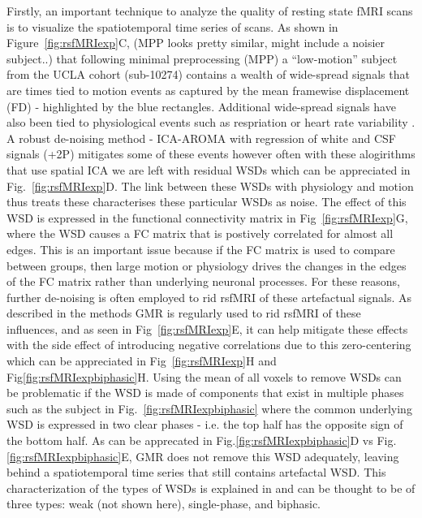 \documentclass[oneside]{zHenriquesLab-StyleBioRxiv}
\begin{document}
Firstly, an important technique to analyze the quality of resting state fMRI scans is to visualize the spatiotemporal time series of scans. As shown in Figure~\ref{fig:rsfMRIexp}C, (MPP looks pretty similar, might include a noisier subject..) that following minimal preprocessing (MPP) a ``low-motion'' subject from the UCLA cohort (sub-10274) contains a wealth of wide-spread signals that are times tied to motion events as captured by the mean framewise displacement (FD) - highlighted by the blue rectangles. Additional wide-spread signals have also been tied to physiological events such as respriation \cite{power2017simple,power2018ridding} or heart rate variability \cite{birn2006separating}. A robust de-noising method - ICA-AROMA with regression of white and CSF signals (+2P) mitigates some of these events however often with these alogirithms that use spatial ICA we are left with residual WSDs \cite{power2018ridding,power2013steps} which can be appreciated in Fig.~\ref{fig:rsfMRIexp}D. The link between these WSDs with physiology and motion thus treats these characterises these particular WSDs as noise. The effect of this WSD is expressed in the functional connectivity matrix in Fig~\ref{fig:rsfMRIexp}G, where the WSD causes a FC matrix that is postively correlated for almost all edges. This is an important issue because if the FC matrix is used to compare between groups, then large motion or physiology drives the changes in the edges of the FC matrix rather than underlying neuronal processes. For these reasons, further de-noising is often employed to rid rsfMRI of these artefactual signals. As described in the methods GMR is regularly used to rid rsfMRI of these influences, and as seen in Fig~\ref{fig:rsfMRIexp}E, it can help mitigate these effects with the side effect of introducing negative correlations due to this zero-centering \cite{murphy2009impact,saad2012-gsr-neg} which can be appreciated in Fig~\ref{fig:rsfMRIexp}H and Fig\ref{fig:rsfMRIexpbiphasic}H. Using the mean of all voxels to remove WSDs can be problematic if the WSD is made of components that exist in multiple phases such as the subject in Fig.~\ref{fig:rsfMRIexpbiphasic} where the common underlying WSD is expressed in two clear phases - i.e. the top half has the opposite sign of the bottom half. As can be apprecated in Fig.\ref{fig:rsfMRIexpbiphasic}D vs Fig.\ref{fig:rsfMRIexpbiphasic}E, GMR does not remove this WSD adequately, leaving behind a spatiotemporal time series that still contains artefactal WSD. This characterization of the types of WSDs is explained in \cite{aquino2019identifying} and can be thought to be of three types: weak (not shown here), single-phase, and biphasic. 
\end{document}
